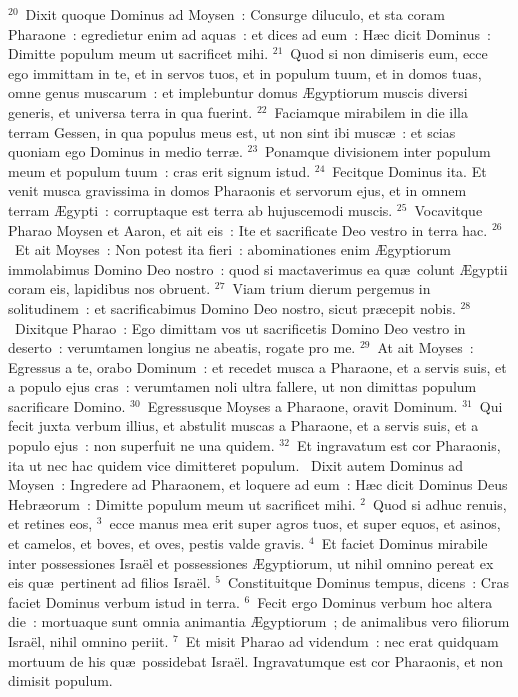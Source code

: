 ${}^{20}$~Dixit quoque Dominus ad Moysen~: Consurge diluculo, et sta coram Pharaone~: egredietur enim ad aquas~: et dices ad eum~: H\ae c dicit Dominus~: Dimitte populum meum ut sacrificet mihi.
${}^{21}$~Quod si non dimiseris eum, ecce ego immittam in te, et in servos tuos, et in populum tuum, et in domos tuas, omne genus muscarum~: et implebuntur domus \AE gyptiorum muscis diversi generis, et universa terra in qua fuerint.
${}^{22}$~Faciamque mirabilem in die illa terram Gessen, in qua populus meus est, ut non sint ibi musc\ae~: et scias quoniam ego Dominus in medio terr\ae .
${}^{23}$~Ponamque divisionem inter populum meum et populum tuum~: cras erit signum istud.
${}^{24}$~Fecitque Dominus ita. Et venit musca gravissima in domos Pharaonis et servorum ejus, et in omnem terram \AE gypti~: corruptaque est terra ab hujuscemodi muscis.
${}^{25}$~Vocavitque Pharao Moysen et Aaron, et ait eis~: Ite et sacrificate Deo vestro in terra hac.
${}^{26}$~Et ait Moyses~: Non potest ita fieri~: abominationes enim \AE gyptiorum immolabimus Domino Deo nostro~: quod si mactaverimus ea qu\ae\ colunt \AE gyptii coram eis, lapidibus nos obruent.
${}^{27}$~Viam trium dierum pergemus in solitudinem~: et sacrificabimus Domino Deo nostro, sicut pr\ae cepit nobis.
${}^{28}$~Dixitque Pharao~: Ego dimittam vos ut sacrificetis Domino Deo vestro in deserto~: verumtamen longius ne abeatis, rogate pro me.
${}^{29}$~At ait Moyses~: Egressus a te, orabo Dominum~: et recedet musca a Pharaone, et a servis suis, et a populo ejus cras~: verumtamen noli ultra fallere, ut non dimittas populum sacrificare Domino.
${}^{30}$~Egressusque Moyses a Pharaone, oravit Dominum.
${}^{31}$~Qui fecit juxta verbum illius, et abstulit muscas a Pharaone, et a servis suis, et a populo ejus~: non superfuit ne una quidem.
${}^{32}$~Et ingravatum est cor Pharaonis, ita ut nec hac quidem vice dimitteret populum.
~Dixit autem Dominus ad Moysen~: Ingredere ad Pharaonem, et loquere ad eum~: H\ae c dicit Dominus Deus Hebr\ae orum~: Dimitte populum meum ut sacrificet mihi.
${}^{2}$~Quod si adhuc renuis, et retines eos,
${}^{3}$~ecce manus mea erit super agros tuos, et super equos, et asinos, et camelos, et boves, et oves, pestis valde gravis.
${}^{4}$~Et faciet Dominus mirabile inter possessiones Isra\"el et possessiones \AE gyptiorum, ut nihil omnino pereat ex eis qu\ae\ pertinent ad filios Isra\"el.
${}^{5}$~Constituitque Dominus tempus, dicens~: Cras faciet Dominus verbum istud in terra.
${}^{6}$~Fecit ergo Dominus verbum hoc altera die~: mortuaque sunt omnia animantia \AE gyptiorum~; de animalibus vero filiorum Isra\"el, nihil omnino periit.
${}^{7}$~Et misit Pharao ad videndum~: nec erat quidquam mortuum de his qu\ae\ possidebat Isra\"el. Ingravatumque est cor Pharaonis, et non dimisit populum.


